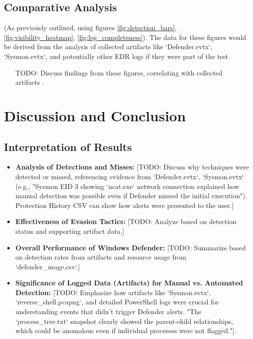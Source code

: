 \documentclass[11pt]{article}
\begin{document}
	\subsection{Comparative Analysis}
	(As previously outlined, using figures \ref{fig:detection_bars}, \ref{fig:visibility_heatmap}, \ref{fig:log_completeness}). The data for these figures would be derived from the analysis of collected artifacts like `Defender.evtx`, `Sysmon.evtx`, and potentially other EDR logs if they were part of the test.
	\begin{itemize}
		\item [TODO: Discuss findings from these figures, correlating with collected artifacts].
	\end{itemize}
	\newpage
	
	\section{Discussion and Conclusion}
	\subsection{Interpretation of Results}
	\begin{itemize}
		\item \textbf{Analysis of Detections and Misses:}
		[TODO: Discuss why techniques were detected or missed, referencing evidence from `Defender.evtx`, `Sysmon.evtx` (e.g., "Sysmon EID 3 showing `ncat.exe` network connection explained how manual detection was possible even if Defender missed the initial execution"). Protection History CSV can show how alerts were presented to the user.]
		\item \textbf{Effectiveness of Evasion Tactics:}
		[TODO: Analyze based on detection status and supporting artifact data.]
		\item \textbf{Overall Performance of Windows Defender:}
		[TODO: Summarize based on detection rates from artifacts and resource usage from `defender_usage.csv`.]
		\item \textbf{Significance of Logged Data (Artifacts) for Manual vs. Automated Detection:}
		[TODO: Emphasize how artifacts like `Sysmon.evtx`, `reverse_shell.pcapng`, and detailed PowerShell logs were crucial for understanding events that didn't trigger Defender alerts. "The `process_tree.txt` snapshot clearly showed the parent-child relationships, which could be anomalous even if individual processes were not flagged."].
	\end{itemize}
	
\end{document}
